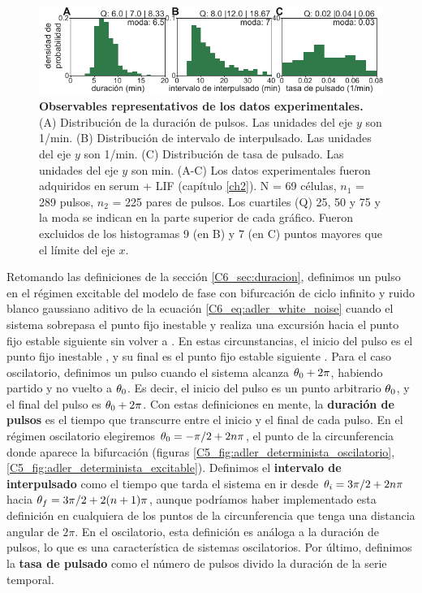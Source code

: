 \documentclass[./main.tex]{subfiles}
\begin{document}
\begin{figure}
    \centering
    \includegraphics[width=1\columnwidth]{figures/chapter6/C6_experimental_stats.pdf} 
    \caption{\textbf{Observables representativos de los datos experimentales.} (A) Distribución de la duración de pulsos. Las unidades del eje $y$ son 1/min. (B) Distribución de intervalo de interpulsado. Las unidades del eje $y$ son 1/min. (C) Distribución de tasa de pulsado. Las unidades del eje $y$ son min. (A-C) Los datos experimentales fueron adquiridos en serum + LIF (capítulo \ref{ch2}). N = 69 células, $n_1$ = 289 pulsos, $n_2$ = 225 pares de pulsos. Los cuartiles (Q) 25, 50 y 75 y la moda se indican en la parte superior de cada gráfico. Fueron excluidos de los histogramas 9 (en B) y 7 (en C) puntos mayores que el límite del eje $x$.}
    \label{C6_fig:observables_experimentales}
\end{figure}


Retomando las definiciones de la sección \ref{C6_sec:duracion}, definimos un pulso en el régimen excitable del modelo de fase con bifurcación de ciclo infinito y ruido blanco gaussiano aditivo de la ecuación \ref{C6_eq:adler_white_noise} cuando el sistema sobrepasa el punto fijo inestable \xxi y realiza una excursión hacia el punto fijo estable siguiente \xxe sin volver a \xxi. En estas circunstancias, el inicio del pulso es el punto fijo inestable \xxi, y su final es el punto fijo estable siguiente \xxe. Para el caso oscilatorio, definimos un pulso cuando el sistema alcanza $\theta_0+2\pi$, habiendo partido y no vuelto a $\theta_0$.  Es decir, el inicio del pulso es un punto arbitrario $\theta_0$, y el final del pulso es $\theta_0+2\pi$. Con estas definiciones en mente, la \textbf{duración de pulsos} es el tiempo que transcurre entre el inicio y el final de cada pulso. En el régimen oscilatorio elegiremos $\theta_0 = -\pi/2 + 2n\pi$, el punto de la circunferencia donde aparece la bifurcación (figuras \ref{C5_fig:adler_determinista_oscilatorio},\ref{C5_fig:adler_determinista_excitable}). Definimos el \textbf{intervalo de interpulsado} como el tiempo que tarda el sistema en ir desde $\theta_i = 3\pi/2+ 2n\pi$ hacia $\theta_f = 3\pi/2 + 2(n+1)\pi$, aunque podríamos haber implementado esta definición en cualquiera de los puntos de la circunferencia que tenga una distancia angular de $2\pi$. En el oscilatorio, esta definición es análoga a la duración de pulsos, lo que es una característica de sistemas oscilatorios. Por último, definimos la \textbf{tasa de pulsado} como el número de pulsos divido la duración de la serie temporal.  
\end{document}
